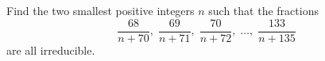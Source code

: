 Find the two smallest positive integers $n$ such that the fractions
$$\frac{68}{n+70}, \; \frac{69}{n+71},\; \frac{70}{n+72},\; \ldots, \; \frac{133}{n+135}$$
are all irreducible.